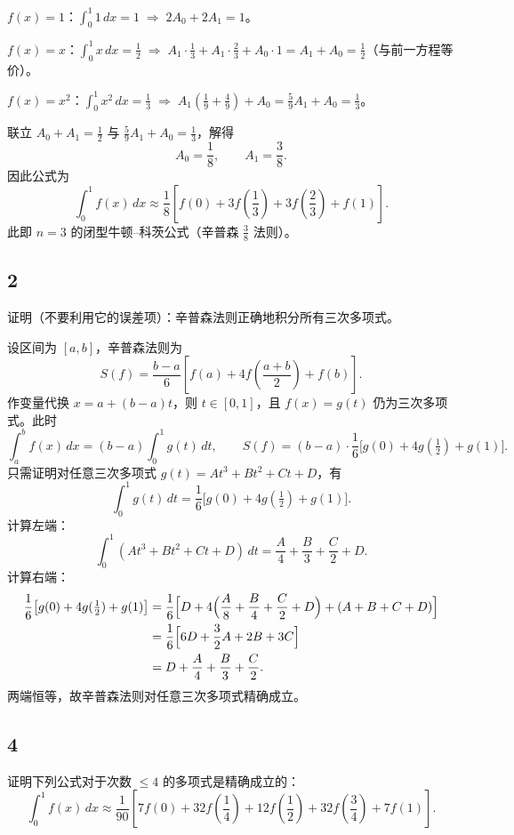 \documentclass{article}
\begin{document}
\(f(x)=1\)：\(\int_0^1 1\,dx = 1 \;\Rightarrow\; 2A_0+2A_1=1\)。  

\(f(x)=x\)：\(\int_0^1 x\,dx = \frac12 \;\Rightarrow\; A_1\cdot\frac13 + A_1\cdot\frac23 + A_0\cdot1 = A_1 + A_0 = \frac12\)（与前一方程等价）。  

\(f(x)=x^2\)：\(\int_0^1 x^2\,dx = \frac13 \;\Rightarrow\; A_1\left(\frac19+\frac49\right) + A_0 = \frac59A_1 + A_0 = \frac13\)。  

联立 \(A_0+A_1=\frac12\) 与 \(\frac59A_1+A_0=\frac13\)，解得  
\[
A_0=\frac18,\qquad A_1=\frac38.
\]  
因此公式为  
\[
\boxed{\int_0^1 f(x)\,dx \approx \frac18\left[f(0)+3f\!\left(\frac13\right)+3f\!\left(\frac23\right)+f(1)\right]}.
\]  
此即 \(n=3\) 的闭型牛顿–科茨公式（辛普森 \(\frac38\) 法则）。

\subsection*{2}
证明（不要利用它的误差项）：辛普森法则正确地积分所有三次多项式。  
  
设区间为 \([a,b]\)，辛普森法则为  
\[
S(f) = \frac{b-a}{6}\left[f(a)+4f\!\left(\frac{a+b}{2}\right)+f(b)\right].
\]  
作变量代换 \(x = a + (b-a)t\)，则 \(t\in[0,1]\)，且 \(f(x)=g(t)\) 仍为三次多项式。此时  
\[
\int_a^b f(x)\,dx = (b-a)\int_0^1 g(t)\,dt,\qquad 
S(f) = (b-a)\cdot\frac{1}{6}\bigl[g(0)+4g(\tfrac12)+g(1)\bigr].
\]  
只需证明对任意三次多项式 \(g(t)=At^3+Bt^2+Ct+D\)，有  
\[
\int_0^1 g(t)\,dt = \frac16\bigl[g(0)+4g(\tfrac12)+g(1)\bigr].
\]  
计算左端：  
\[
\int_0^1 (At^3+Bt^2+Ct+D)\,dt = \frac{A}{4}+\frac{B}{3}+\frac{C}{2}+D.
\]  
计算右端：  
\[
\begin{aligned}
\frac16\bigl[g(0)+4g(\tfrac12)+g(1)\bigr] 
&= \frac16\Bigl[D + 4\Bigl(\frac{A}{8}+\frac{B}{4}+\frac{C}{2}+D\Bigr) + (A+B+C+D)\Bigr] \\
&= \frac16\Bigl[6D + \frac{3}{2}A + 2B + 3C\Bigr] \\
&= D + \frac{A}{4} + \frac{B}{3} + \frac{C}{2}.
\end{aligned}
\]  
两端恒等，故辛普森法则对任意三次多项式精确成立。

\subsection*{4}
证明下列公式对于次数 \(\leq 4\) 的多项式是精确成立的：  
\[
\int_0^1 f(x)\,dx \approx \frac{1}{90}\left[7f(0)+32f\!\left(\frac14\right)+12f\!\left(\frac12\right)+32f\!\left(\frac34\right)+7f(1)\right].
\]
  
\end{document}
